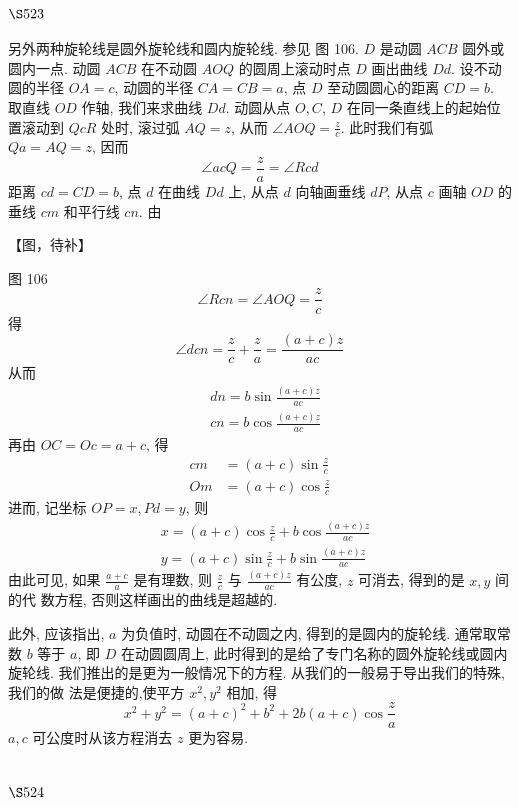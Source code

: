 \section{$\S 523$}

另外两种旋轮线是圆外旋轮线和圆内旋轮线. 参见 图 106. $D$ 是动圆 $A C B$ 圆外或圆内一点. 动圆 $A C B$ 在不动圆 $A O Q$ 的圆周上滚动时点 $D$ 画出曲线 $D d$. 设不动圆的半径 $O A=c$, 动圆的半径 $C A=C B=a$, 点 $D$ 至动圆圆心的距离 $C D=b$. 取直线 $O D$ 作轴, 我们来求曲线 $D d$. 动圆从点 $O, C$, $D$ 在同一条直线上的起始位置滚动到 $Q c R$ 处时, 滚过弧 $A Q=z$, 从而 $\angle A O Q=\frac{z}{c}$. 此时我们有弧 $Q a=A Q=z$, 因而
\[
\angle a c Q=\frac{z}{a}=\angle R c d
\]
距离 $c d=C D=b$, 点 $d$ 在曲线 $D d$ 上, 从点 $d$ 向轴画垂线 $d P$, 从点 $c$ 画轴 $O D$ 的垂线 $c m$ 和平行线 $c n$. 由


【图，待补】

图 106
\[
\angle R c n=\angle A O Q=\frac{z}{c}
\]
得
\[
\angle d c n=\frac{z}{c}+\frac{z}{a}=\frac{(a+c) z}{a c}
\]
从而
\[
\begin{aligned}
& d n=b \sin \frac{(a+c) z}{a c} \\
& c n=b \cos \frac{(a+c) z}{a c}
\end{aligned}
\]
再由 $O C=O c=a+c$, 得
\[
\begin{aligned}
c m & =(a+c) \sin \frac{z}{c} \\
O m & =(a+c) \cos \frac{z}{c}
\end{aligned}
\]
进而, 记坐标 $O P=x, P d=y$, 则
\[
\begin{aligned}
& x=(a+c) \cos \frac{z}{c}+b \cos \frac{(a+c) z}{a c} \\
& y=(a+c) \sin \frac{z}{c}+b \sin \frac{(a+c) z}{a c}
\end{aligned}
\]
由此可见, 如果 $\frac{a+c}{a}$ 是有理数, 则 $\frac{z}{c}$ 与 $\frac{(a+c) z}{a c}$ 有公度, $z$ 可消去, 得到的是 $x, y$ 间的代 数方程, 否则这样画出的曲线是超越的.

此外, 应该指出, $a$ 为负值时, 动圆在不动圆之内, 得到的是圆内的旋轮线. 通常取常 数 $b$ 等于 $a$, 即 $D$ 在动圆圆周上, 此时得到的是给了专门名称的圆外旋轮线或圆内旋轮线. 我们推出的是更为一般情况下的方程. 从我们的一般易于导出我们的特殊, 我们的做 法是便捷的,使平方 $x^{2}, y^{2}$ 相加, 得
\[
x^{2}+y^{2}=(a+c)^{2}+b^{2}+2 b(a+c) \cos \frac{z}{a}
\]
$a, c$ 可公度时从该方程消去 $z$ 更为容易.

\section{$\S 524$}

